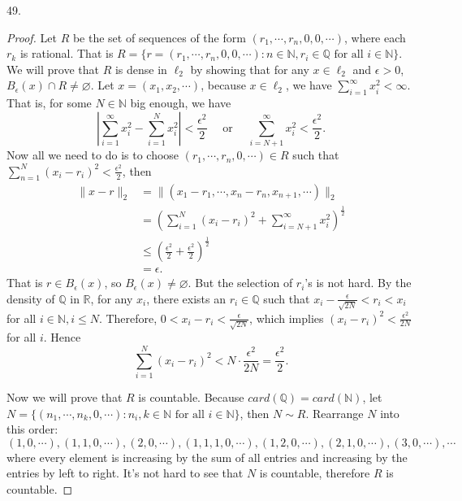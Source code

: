 \documentclass[12pt, a4paper]{article}
\theoremstyle{plain}
\newcommand{\N}{\mathbb{N}}
\newcommand{\Q}{\mathbb{Q}}
\newcommand{\R}{\mathbb{R}}
\begin{document}
\pagebreak

49.
\begin{proof}
Let $R$ be the set of sequences of the form $(r_1,\cdots ,r_n,0,0,\cdots )$, where each $r_k$ is rational. That is $R=\{r=(r_1,\cdots ,r_n,0,0,\cdots ): n\in\N, r_i\in\Q \text{ for all } i\in \N\}$. We will prove that $R$ is dense in $\ell_2$ by showing that for any $x\in \ell_2$ and $\epsilon>0$, $B_\epsilon(x)\cap R\neq \varnothing$. Let $x=(x_1,x_2,\cdots)$, because $x\in \ell_2$, we have $\sum_{i=1}^{\infty}{x_i^2}<\infty$. That is, for some $N\in\N$ big enough, we have
\[
\left|\sum_{i=1}^{\infty}{x_i^2} -\sum_{i=1}^{N}{x_i^2}\right|<\frac{\epsilon^2}{2}\quad \text{ or } \quad \sum_{i=N+1}^{\infty}{x_i^2}<\frac{\epsilon^2}{2}.
\] 
Now all we need to do is to choose $(r_1,\cdots ,r_n,0,\cdots)\in R$ such that $\sum_{n=1}^{N}{(x_i-r_i)^2}<\frac{\epsilon^2}{2}$, then
\begin{align*}
\|x-r\|_2&=\|(x_1-r_1,\cdots, x_n-r_n, x_{n+1},\cdots)\|_2\\
&=\left(\sum_{i=1}^{N}{(x_i-r_i)^2}+\sum_{i=N+1}^{\infty}{x_i^2}\right)^\frac{1}{2}\\
&\leq \left(\frac{\epsilon^2}{2}+\frac{\epsilon^2}{2}\right)^\frac{1}{2}\\
&=\epsilon.
\end{align*}
That is $r\in B_\epsilon(x)$, so $B_\epsilon(x)\neq \varnothing$. But the selection of $r_i$'s is not hard. By the density of $\Q$ in $\R$, for any $x_i$, there exists an $r_i\in \Q$ such that $x_i-\frac{\epsilon}{\sqrt{2N}}<r_i<x_i$ for all $i\in \N, i\leq N$. Therefore, $0<x_i-r_i<\frac{\epsilon}{\sqrt{2N}}$, which implies $(x_i-r_i)^2<\frac{\epsilon^2}{2N}$ for all $i$. Hence
\[
\sum_{i=1}^{N}{(x_i-r_i)^2}<N\cdot \frac{\epsilon^2}{2N}=\frac{\epsilon^2}{2}.
\]

Now we will prove that $R$ is countable. Because $card(\Q)=card(\N)$, let $N=\{(n_1,\cdots ,n_k,0,\cdots):n_i,k\in\N \text{ for all } i\in \N\}$, then $N\sim R$. Rearrange $N$ into this order:
\[
(1,0,\cdots),(1,1,0,\cdots),(2,0,\cdots),(1,1,1,0,\cdots),(1,2,0,\cdots),(2,1,0,\cdots),(3,0,\cdots),\cdots
\]
where every element is increasing by the sum of all entries and increasing by the entries by left to right. It's not hard to see that $N$ is countable, therefore $R$ is countable. 


\end{proof}
\end{document}
